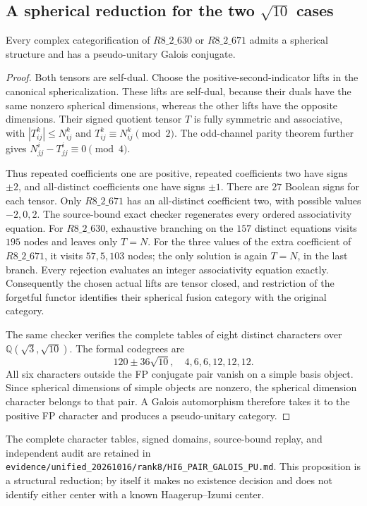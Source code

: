 \subsection{A spherical reduction for the two $\sqrt{10}$ cases}
\begin{proposition}\label{prop:hi6-pair-galois-pu}
Every complex categorification of $R8\_2\_630$ or $R8\_2\_671$
admits a spherical structure and has a pseudo-unitary Galois conjugate.
\end{proposition}
\begin{proof}
Both tensors are self-dual. Choose the positive-second-indicator
lifts in the canonical sphericalization. These lifts are self-dual,
because their duals have the same nonzero spherical dimensions,
whereas the other lifts have the opposite dimensions. Their signed
quotient tensor $T$ is fully symmetric and associative, with
$|T_{ij}^k|\leq N_{ij}^k$ and $T_{ij}^k\equiv N_{ij}^k\pmod2$.
The odd-channel parity theorem \cite[Theorem~3.9]{TPEParity} further gives
$N_{jj}^i-T_{jj}^i\equiv0\pmod4$.

Thus repeated coefficients one are positive, repeated coefficients
two have signs $\pm2$, and all-distinct coefficients one have signs
$\pm1$. There are $27$ Boolean signs for each tensor. Only
$R8\_2\_671$ has an all-distinct coefficient two, with possible values
$-2,0,2$. The source-bound exact checker regenerates every ordered
associativity equation. For $R8\_2\_630$, exhaustive branching on the
$157$ distinct equations visits $195$ nodes and leaves only $T=N$.
For the three values of the extra coefficient of $R8\_2\_671$, it
visits $57,5,103$ nodes; the only solution is again $T=N$, in the
last branch. Every rejection evaluates an integer associativity
equation exactly. Consequently the chosen actual lifts are tensor
closed, and restriction of the forgetful functor identifies their
spherical fusion category with the original category.

The same checker verifies the complete tables of eight distinct
characters over $\mathbb Q(\sqrt3,\sqrt{10})$. The formal codegrees are
\[
120\pm36\sqrt{10},\quad 4,6,6,12,12,12.
\]
All six characters outside the FP conjugate pair vanish on a simple
basis object. Since spherical dimensions of simple objects are
nonzero, the spherical dimension character belongs to that pair.
A Galois automorphism therefore takes it to the positive FP
character and produces a pseudo-unitary category.
\end{proof}

The complete character tables, signed domains, source-bound replay,
and independent audit are retained in
\texttt{evidence/unified\_20261016/rank8/HI6\_PAIR\_GALOIS\_PU.md}.
This proposition is a structural reduction; by itself it makes no
existence decision and does not identify either center with a known
Haagerup--Izumi center.
